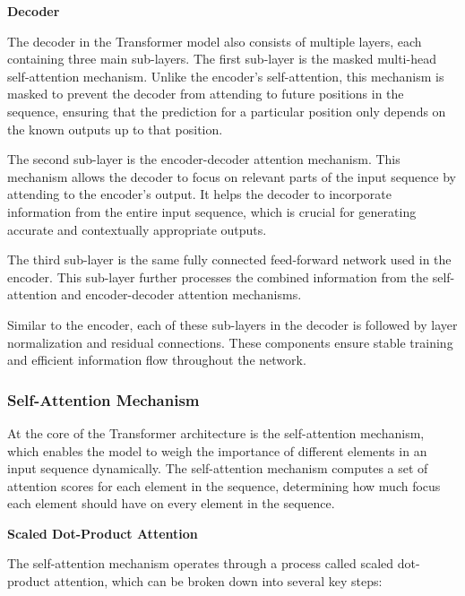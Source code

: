 \noindent\textbf{Decoder}

\noindent The decoder in the Transformer model also consists of multiple layers, each containing three main sub-layers. The first sub-layer is the masked multi-head self-attention mechanism. Unlike the encoder's self-attention, this mechanism is masked to prevent the decoder from attending to future positions in the sequence, ensuring that the prediction for a particular position only depends on the known outputs up to that position.

The second sub-layer is the encoder-decoder attention mechanism. This mechanism allows the decoder to focus on relevant parts of the input sequence by attending to the encoder's output. It helps the decoder to incorporate information from the entire input sequence, which is crucial for generating accurate and contextually appropriate outputs.

The third sub-layer is the same fully connected feed-forward network used in the encoder. This sub-layer further processes the combined information from the self-attention and encoder-decoder attention mechanisms.

Similar to the encoder, each of these sub-layers in the decoder is followed by layer normalization and residual connections. These components ensure stable training and efficient information flow throughout the network.
\vspace{10pt}

\subsubsection{Self-Attention Mechanism}
At the core of the Transformer architecture is the self-attention mechanism, which enables the model to weigh the importance of different elements in an input sequence dynamically. The self-attention mechanism computes a set of attention scores for each element in the sequence, determining how much focus each element should have on every element in the sequence.
\vspace{10pt}

\noindent\textbf{Scaled Dot-Product Attention}

\noindent The self-attention mechanism operates through a process called scaled dot-product attention, which can be broken down into several key steps:

